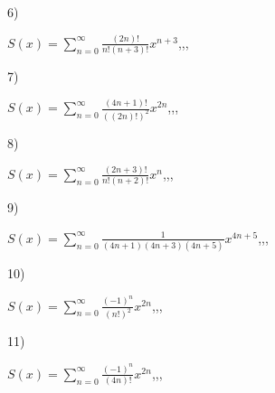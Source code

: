 \documentclass[11pt, ukrainian]{article}
\begin{document}
\par
\vspace{0.9cm}
6) \space 
{%
{$S(x)=\sum\limits_{n=0}^{\infty}{\frac{(2n)!}{n!(n+3)!}}{x^{{n+3}}}$},,, \par \smallskip  
}
\par
\vspace{0.9cm}
7) \space 
{%
{$S(x)=\sum\limits_{n=0}^{\infty}{\frac{(4n+1)!}{((2n)!)^2}}{x^{{2n}}}$},,, \par \smallskip  
}
\par
\vspace{0.9cm}
8) \space 
{%
{$S(x)=\sum\limits_{n=0}^{\infty}{\frac{(2n+3)!}{n!(n+2)!}}{x^{n}}$},,, \par \smallskip  
}
\par
\vspace{0.9cm}
9) \space 
{%
{$S(x)=\sum\limits_{n=0}^{\infty}{\frac{1}{(4n+1)(4n+3)(4n+5)}}{x^{{4n+5}}}$},,, \par \smallskip  
}
\par
\vspace{0.9cm}
10) \space 
{%
{$S(x)=\sum\limits_{n=0}^{\infty}{\frac{(-1)^n}{(n!)^2}}{x^{{2n}}}$},,, \par \smallskip  
}
\par
\newpage
11) \space 
{%
{$S(x)=\sum\limits_{n=0}^{\infty}{\frac{(-1)^n}{(4n)!}}{x^{{2n}}}$},,, \par \smallskip  
}
\end{document}
